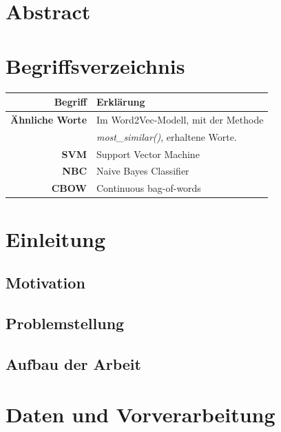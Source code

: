 \documentclass[12pt,a4paper]{report}
\begin{document}
\chapter*{Abstract}
\newpage
\tableofcontents
\newpage
\chapter*{Begriffsverzeichnis}
	\begin{tabular}{r|l}	
	\textbf{Begriff} & Erklärung\\
	\hline	
	\textbf{Ähnliche Worte} & Im Word2Vec-Modell, mit der Methode\\
	& \textit{most\_similar()}, erhaltene Worte.\\
	\textbf{SVM} & Support Vector Machine\\
	\textbf{NBC} & Naive Bayes Classifier\\
	\textbf{CBOW} & Continuous bag-of-words\\

\end{tabular}
\newpage
{}
\chapter{Einleitung}
	\section{Motivation}
	
	\section{Problemstellung}
	\section{Aufbau der Arbeit}

\newpage
\chapter{Daten und Vorverarbeitung}
\end{document}
